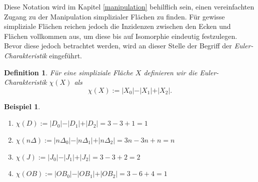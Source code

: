 \documentclass[12pt,titlepage,twoside,cleardoublepage]{article}
\theoremstyle{nummermitklammern}
\newtheorem{vor}[temp]{Vorüberlegung}
\newtheorem{bsp}[temp]{Beispiel}
\newtheorem{definition}[temp]{Definition}
\newtheorem{definition}[zahl]{Definition}
\newtheorem{vor}[zahl]{Vorüberlegung}
\newtheorem{bsp}[zahl]{Beispiel}
\numberwithin{equation}{section}
\begin{document}
Diese Notation wird im Kapitel \ref{manipulation} behilflich sein, einen vereinfachten Zugang zu der Manipulation simplizialer Flächen zu finden. Für gewisse simpliziale Flächen reichen jedoch die Inzidenzen zwischen den Ecken und Flächen vollkommen aus, um diese bis auf Isomorphie eindeutig festzulegen. Bevor diese jedoch betrachtet werden, wird an dieser Stelle der Begriff der \emph{Euler-Charakteristik} eingeführt.
\begin{definition}
Für eine simpliziale Fläche $X$ definieren wir die \emph{Euler-Charakteristik} $\chi (X)$ als 
\[
\chi(X):=\vert X_0\vert-\vert X_1\vert+\vert X_2\vert.
\]
\end{definition}
\begin{bsp}
\begin{enumerate}
Beim Betrachten der im obigem Beispiel eingeführten simplizialen Flächen ergeben sich folgende Euler-Charakteristiken:
\item $\chi(D):=\vert D_0\vert-\vert D_1\vert+\vert D_2\vert=3-3+1=1$
\item $\chi(n\Delta):=\vert n\Delta_0\vert-\vert n\Delta_1\vert+\vert n\Delta_2\vert=3n-3n+n=n$
\item $\chi(J):=\vert J_0\vert-\vert J_1\vert+\vert J_2\vert=3-3+2=2$
\item $\chi(OB):=\vert OB_0\vert-\vert OB_1\vert+\vert OB_2\vert=3-6+4=1$
\end{enumerate}
\end{bsp}


\end{document}
